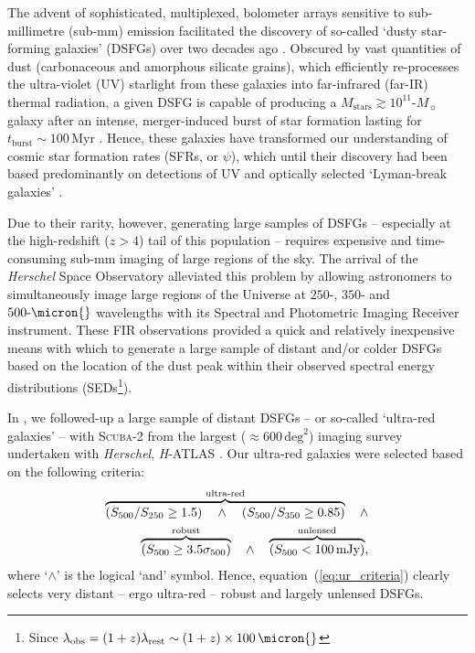 \documentclass[a4paper, fleqn, usenatbib]{mnras}
\newcommand{\herschel}{\textit{Herschel}}
\newcommand{\msol}{M_{\sun}}
\newcommand{\mstars}{M_{\text{stars}}}
\newcommand{\scuba}{\mbox{\textsc{Scuba}-2}}
\begin{document}
The advent of sophisticated, multiplexed, bolometer arrays sensitive to sub-millimetre (sub-mm) emission \citep{kreysa98, holland99} facilitated the discovery of so-called `dusty star-forming galaxies' (DSFGs) over two decades ago \citep{smail97, barger98, hughes98, eales99}.
%
Obscured by vast quantities of dust (carbonaceous and amorphous silicate grains), which efficiently re-processes the ultra-violet (UV) starlight from these galaxies into far-infrared (far-IR) thermal radiation, a given DSFG is capable of producing a  $\mstars{}\gtrsim10^{11}\text{-}\msol{}$ galaxy after an intense, merger-induced burst of star formation lasting for $t_{\text{burst}}\sim100\,\text{Myr}$ \citep{lapi14, aversa15}.
%
Hence, these galaxies have transformed our understanding of cosmic star formation rates (SFRs, or $\psi$), which until their discovery had been based predominantly on detections of UV and optically selected `Lyman-break galaxies' \citep{steidel96, giavalisco02}.

Due to their rarity, however, generating large samples of DSFGs -- especially at the high-redshift ($z>4$) tail of this population -- requires expensive and time-consuming sub-mm imaging of large regions of the sky.
The arrival of the \herschel{} Space Observatory \citep{pilbratt10} alleviated this problem by allowing astronomers to simultaneously image large regions of the Universe at $250\text{-}$, $350\text{-}$ and $500\text{-}\micron{}$ wavelengths with its Spectral and Photometric Imaging Receiver \citep[SPIRE ---][]{griffin10} instrument.
These FIR observations provided a quick and relatively inexpensive means with which to generate a large sample of distant and/or colder DSFGs based on the location of the dust peak within their observed spectral energy distributions (SEDs\footnote{Since $\lambda_{\text{obs}}=(1+z)\lambda_{\text{rest}}\sim(1+z)\times100\,\micron{}$}).

In \citet[][hereafter ]{ivison16}, we followed-up a large sample of distant DSFGs -- or so-called `ultra-red galaxies' -- with \scuba{} \citep{holland13} from the largest ($\approx600\,\text{deg}^2$) imaging survey undertaken with \herschel{}, \textit{H}-ATLAS \citep[\herschel{}-Astrophysical Terahertz Large Area Survey ---][]{eales10}.
Our ultra-red galaxies were selected based on the following criteria:
\begin{align}
    \label{eq:ur_criteria}
    \overbrace{\left(S_{500}/S_{250}\ge1.5\right)\quad\land\quad\left(S_{500}/S_{350}\ge0.85\right)}^{\text{ultra-red}}\quad\land\hfill\\\nonumber
    \overbrace{\left(S_{500}\ge3.5\sigma_{500}\right)}^{\text{robust}}\quad\land\quad
    \overbrace{\left(S_{500}<100\,\text{mJy}\right)}^{\text{unlensed}},
\end{align}
\noindent
where `$\land$' is the logical `and' symbol.
Hence, equation~(\ref{eq:ur_criteria}) clearly selects very distant -- ergo ultra-red \citep{cox11} -- robust and largely unlensed \citep{negrello10} DSFGs.
\end{document}
